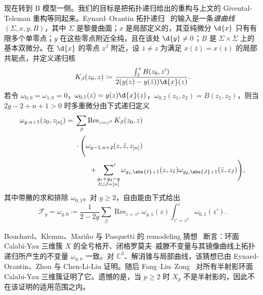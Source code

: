 \documentclass{amsart}
\theoremstyle{definition}
\theoremstyle{remark}
\theoremstyle{plain}
\theoremstyle{definition}
\theoremstyle{remark}
\newcommand{\C}{\mathbb{C}}
\newcommand{\mc}[1]{\mathcal{#1}}
\newcommand{\on}[1]{\operatorname{#1}}
\newcommand{\1}{\mathbf{1}}
\newcommand{\2}{\mathbf{2}}
\newcommand{\3}{\mathbf{3}}
\begin{document}
现在转到 B 模型一侧。我们的目标是把拓扑递归给出的重构与上文的 Givental-Teleman 重构等同起来。Eynard--Orantin 拓扑递归~\cite{EO2007} 的输入是一条\textit{谱曲线} \((\Sigma,x,y,B)\)，其中 \(\Sigma\) 是黎曼曲面；\(x\) 是局部定义的，其亚纯微分 \(\d{x}\) 只有有限多个单零点；\(y\) 在这些零点附近全纯，且在该处 \(\d{y} \neq 0\)；\(B\) 是 \(\Sigma \times \Sigma\) 上的基本双微分。在 \(\d{x}\) 的零点 \(z^{\beta}\) 附近，设 \(\bar{z} \neq z\) 为满足 \(x(\bar{z}) = x(z)\) 的局部共轭点，并定义递归核
\[ K_{\beta}(z_0,z) \coloneqq \frac{\int_{\bar{z}}^z B(z_0,z')}{2(y(z)-y(\bar{z}))\d{x}(z)}. \]
若令 \(\omega_{0,0} = \omega_{1,0} = 0\)，\(\omega_{0,1}(z) = y(z)\d{x}(z)\)，\(\omega_{0,2}(z_1,z_2) = B(z_1,z_2)\)，则当 \(2g-2+n+1 > 0\) 时多重微分由下式递归定义
\begin{align*}
    \omega_{g,n+1}(z_0,z_{[n]}) ={}& \sum_{\beta}\on{Res}_{z = z^{\beta}} K_{\beta}(z_0,z) \\
    &\cdot \Bigg( \omega_{g-1,n+2}(z,\bar{z},z_{[n]}) \\
    &\qquad + \sideset{}{'}\sum_{\substack{g_1+g_2 = g \\ I \sqcup J = [n]}}\omega_{g_1,\abs{I}+1}(z,z_I)\omega_{g_2,\abs{J}+1}(\bar{z},z_J)\Bigg),
\end{align*}
其中带撇的求和排除 \(\omega_{0,1}\)。对 \(g \geq 2\)，自由能由下式给出
\[ \mc{F}_g = \omega_{g,0} \coloneqq \frac{1}{2-2g}\sum_{\beta}\on{Res}_{z=z^{\beta}}\omega_{g,1}(z)\int_{z'=z^{\beta}}^z \omega_{0,1}(z'). \]

Bouchard、Klemm、Mari\~{n}o 与 Pasquetti 的 remodeling 猜想~\cite{BKMP2009} 断言：环面 Calabi-Yau 三维簇 \(X\) 的全亏格开、闭格罗莫夫–威滕不变量与其镜像曲线上拓扑递归所产生的不变量 \(\omega_{g,n}\) 一致。对 \(\C^3\)、解消锥与局部曲线，该猜想已由 Eynard-Orantin、Zhou 与 Chen-Li-Liu 证明。随后 Fang--Liu--Zong~\cite{FLZ2020} 对所有半射影环面 Calabi-Yau 三维簇证明了它。遗憾的是，当 \(p \geq 2\) 时 \(X_p\) 不是半射影的，因此不在该证明的适用范围之内。
\end{document}
